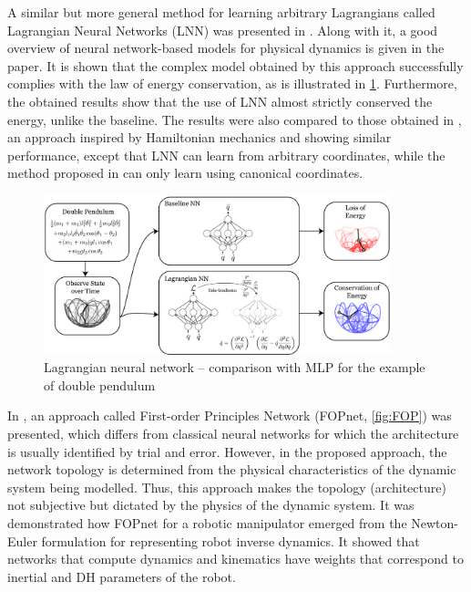 A similar but more general method for learning arbitrary Lagrangians called Lagrangian Neural Networks (LNN) was presented in \cite{Cranmer2020}. Along with it, a good overview of neural network-based models for physical dynamics is given in the paper. It is shown that the complex model obtained by this approach successfully complies with the law of energy conservation, as is illustrated in \cref{fig:LagrangianNN}. Furthermore, the obtained results show that the use of LNN almost strictly conserved the energy, unlike the baseline. The results were also compared to those obtained in \cite{Greydanus2019}, an approach inspired by Hamiltonian mechanics and showing similar performance, except that LNN can learn from arbitrary coordinates, while the method proposed in \cite{Greydanus2019} can only learn using canonical coordinates.

\begin{figure}
    \centering
    \includegraphics[width=0.9\textwidth]{slike/Fig02_08.png}
    \caption[Lagrangian neural network]{Lagrangian neural network -- comparison with MLP for the example of double pendulum \cite{Cranmer2020}}
    \label{fig:LagrangianNN}
\end{figure}

In \cite{Ledezma2017}, an approach called First-order Principles Network (FOPnet, \cref{fig:FOP}) was presented, which differs from classical neural networks for which the architecture is usually identified by trial and error. However, in the proposed approach, the network topology is determined from the physical characteristics of the dynamic system being modelled. Thus, this approach makes the topology (architecture) not subjective but dictated by the physics of the dynamic system. It was demonstrated how FOPnet for a robotic manipulator emerged from the Newton-Euler formulation for representing robot inverse dynamics. It showed that networks that compute dynamics and kinematics have weights that correspond to inertial and DH parameters of the robot.

